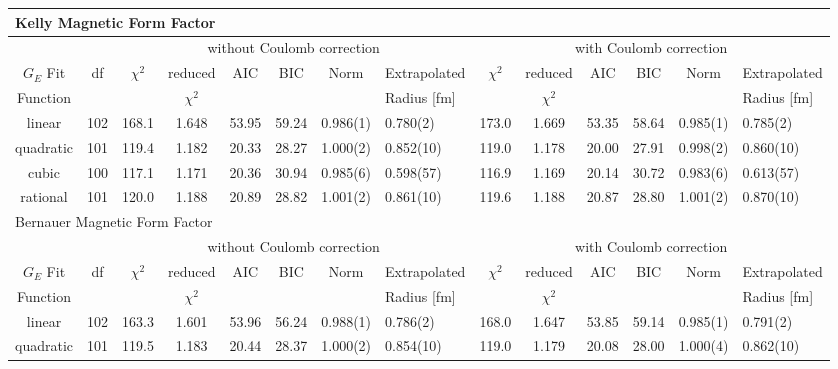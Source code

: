 \documentclass[10pt,superscriptaddress,aps,prc,twocolumn]{revtex4-1}
\begin{document}
\begin{table}
\begin{tabular}{cc|cccccl|cccccl}
\multicolumn{14}{l}{Kelly Magnetic Form Factor}                                   \\ \hline
          &     & \multicolumn{6}{c}{without Coulomb correction}                 & \multicolumn{6}{|c}{with Coulomb correction} \\
$G_E$ Fit & df  & $\chi^2$ & reduced   & AIC    & BIC    & Norm      & Extrapolated    & $\chi^2$ & reduced   & AIC    & BIC    & Norm      & Extrapolated     \\  
Function  &     &          & $\chi^2$  &        &        &           & Radius [fm]      &          & $\chi^2$  &        &        &           & Radius [fm]            \\ \hline
linear    & 102 & 168.1    & 1.648     & 53.95  & 59.24  & 0.986(1)  & 0.780(2)  & 173.0    & 1.669     & 53.35  & 58.64  & 0.985(1)  & 0.785(2)    \\
quadratic & 101 & 119.4    & 1.182     & 20.33  & 28.27  & 1.000(2)  & 0.852(10) & 119.0    & 1.178     & 20.00  & 27.91  & 0.998(2)  & 0.860(10)   \\
cubic     & 100 & 117.1    & 1.171     & 20.36  & 30.94  & 0.985(6)  & 0.598(57) & 116.9    & 1.169     & 20.14  & 30.72  & 0.983(6)  & 0.613(57)   \\    
rational  & 101 & 120.0    & 1.188     & 20.89  & 28.82  & 1.001(2)  & 0.861(10) & 119.6    & 1.188     & 20.87  & 28.80  & 1.001(2)  & 0.870(10)   \\ \hline \hline
\multicolumn{14}{l}{Bernauer Magnetic Form Factor}                                 \\ \hline
          &     & \multicolumn{6}{c}{without Coulomb correction}                 & \multicolumn{6}{|c}{with Coulomb correction} \\
$G_E$ Fit & df  & $\chi^2$ & reduced   & AIC    & BIC    & Norm      & Extrapolated    & $\chi^2$ & reduced   & AIC    & BIC    & Norm      & Extrapolated      \\  
Function  &     &          &$\chi^2$  &        &       &             & Radius [fm]      &          & $\chi^2$  &        &        &           & Radius [fm]            \\ \hline
linear    & 102 & 163.3    & 1.601     & 53.96  & 56.24 & 0.988(1)   & 0.786(2)  & 168.0    & 1.647     & 53.85  & 59.14  & 0.985(1)  & 0.791(2)    \\
quadratic & 101 & 119.5    & 1.183     & 20.44  & 28.37 & 1.000(2)   & 0.854(10) & 119.0    & 1.179     & 20.08  & 28.00  & 1.000(4)  & 0.862(10)    \\ 

\end{tabular}
\end{table}
\end{document}
